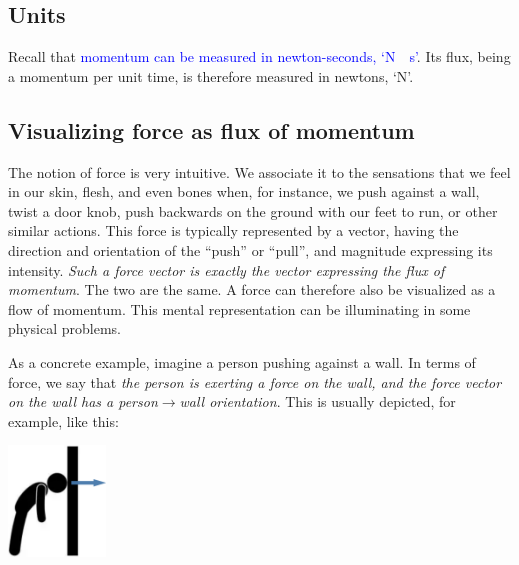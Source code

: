 \documentclass[a4paper,12pt,%
onecolumn,oneside,titlepage,%
british%
]{memoir}
\renewcommand*{\|}[1][]{\nonscript\:#1\vert\nonscript\:\mathopen{}}
\newcommand*{\sect}{\S}%
\renewcommand*{\autoref}[2]{\sidepar{\vspace{-1ex}\footnotesize{\color{blue}\faIcon{%
angle-right%
}\enspace\sect\,\ref{#1} page\,\pageref{#1}}}\textcolor{blue}{#2}}
\begin{document}
\subsection{Units}
\label{sec:units_momflux}

Recall that \autoref{sec:intro_momentum}{momentum can be measured in newton-seconds, \enquote*{\unit{N\cdot s}}}. Its flux, being a momentum per unit time, is therefore measured in newtons, \enquote*{\unit{N}}.

\subsection{Visualizing force as flux of momentum}
\label{sec:visualize_force}

The notion of force is very intuitive. We associate it to the sensations that we feel in our skin, flesh, and even bones when, for instance, we push against a wall, twist a door knob, push backwards on the ground with our feet to run, or other similar actions. This force is typically represented by a vector, having the direction and orientation of the \enquote{push} or \enquote{pull}, and magnitude expressing its intensity. \emph{Such a force vector is exactly the vector expressing the flux of momentum}. The two are the same. A force can therefore also be visualized as a flow of momentum. This mental representation can be illuminating in some physical problems.

As a concrete example, imagine a person pushing against a wall. In terms of force, we say that \emph{the person is exerting a force on the wall,
  and the force vector on the wall has a person$\rightarrow$wall orientation}. This is usually depicted, for example, like this:%
\begin{center}
    \includegraphics[height=8em]{images/person_push_force.pdf}
\end{center}
\end{document}
